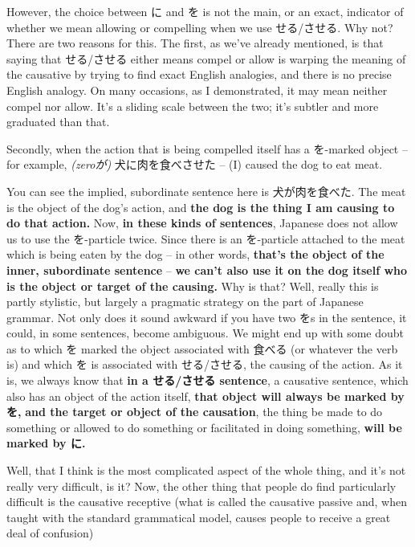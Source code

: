 However, the choice between に and を is not the main, or an exact, indicator of whether we mean allowing or compelling when we use せる/させる. Why not? There are two reasons for this. The first, as we've already mentioned, is that saying that せる/させる either means compel or allow is warping the meaning of the causative by trying to find exact English analogies, and there is no precise English analogy. On many occasions, as I demonstrated, it may mean neither compel nor allow. It's a sliding scale between the two; it's subtler and more graduated than that.

\thinrule

Secondly, when the action that is being compelled itself has a を-marked object -- for example, {\em (zeroが)} 犬に肉を食べさせた -- (I) caused the dog to eat meat.

{}

You can see the implied, subordinate sentence here is 犬が肉を食べた. The meat is the object of the dog's action, and {\bf the dog is the thing I am causing to do that action.} Now, {\bf in these kinds of sentences}, Japanese does not allow us to use the を-particle twice. Since there is an を-particle attached to the meat which is being eaten by the dog -- in other words, {\bf that's the object of the inner, subordinate sentence} -- {\bf we can't also use it on the dog itself who is the object or target of the causing.} Why is that? Well, really this is partly stylistic, but largely a pragmatic strategy on the part of Japanese grammar. Not only does it sound awkward if you have two をs in the sentence, it could, in some sentences, become ambiguous. We might end up with some doubt as to which を marked the object associated with 食べる (or whatever the verb is) and which を is associated with せる/させる, the causing of the action. As it is, we always know that {\bf in a せる/させる sentence}, a causative sentence, which also has an object of the action itself, {\bf that object will always be marked by を,} {\bf and the target or object of the causation}, the thing be made to do something or allowed to do something or facilitated in doing something, {\bf will be marked by に.}

Well, that I think is the most complicated aspect of the whole thing, and it's not really very difficult, is it? Now, the other thing that people do find particularly difficult is the causative receptive (what is called the causative passive and, when taught with the standard grammatical model, causes people to receive a great deal of confusion)

